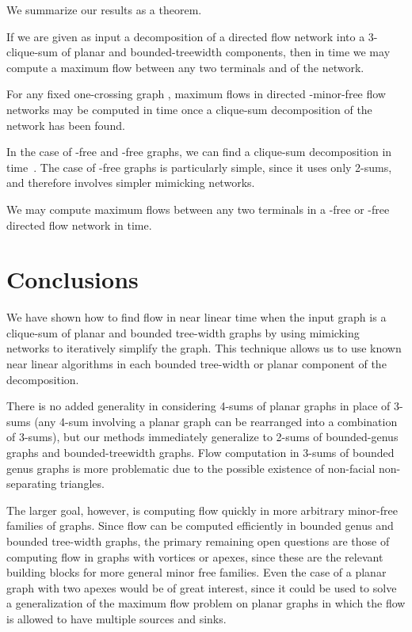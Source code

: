\documentclass[runningheads]{llncs}
\begin{document}
We summarize our results as a theorem.

\begin{theorem}
If we are given as input a decomposition of a directed flow network into a 3-clique-sum of planar and bounded-treewidth components, then in  time we may compute a maximum flow between any two terminals  and  of the network.
\end{theorem}

\begin{corollary}
For any fixed one-crossing graph , maximum flows in directed -minor-free flow networks may be computed in  time once a clique-sum decomposition of the network has been found.
\end{corollary}

In the case of -free and -free graphs, we can find a clique-sum decomposition in  time~\cite{asano85,rl-ork5mfg-08}. The case of -free graphs is particularly simple, since it uses only 2-sums, and therefore involves simpler mimicking networks.

\begin{corollary}
We may compute maximum flows between any two terminals in a -free or -free directed flow network in  time.
\end{corollary}



\section{Conclusions}

We have shown how to find flow in near linear time when the input graph is a clique-sum of planar and bounded tree-width graphs by using mimicking networks to iteratively simplify the graph. This technique allows us to use known near linear algorithms in each bounded tree-width or planar component of the decomposition.

There is no added generality in considering 4-sums of planar graphs in place of 3-sums (any 4-sum involving a planar graph can be rearranged into a combination of 3-sums), but our methods immediately generalize to 2-sums of bounded-genus graphs and bounded-treewidth graphs. Flow computation in 3-sums of bounded genus graphs is more problematic due to the possible existence of non-facial non-separating triangles.

The larger goal, however, is computing flow quickly in more arbitrary minor-free families of graphs.  Since flow can be computed efficiently in bounded genus and bounded tree-width graphs, the primary remaining open questions are those of computing flow in graphs with vortices or apexes, since these are the relevant building blocks for more general minor free families.   Even the case of a planar graph with two apexes would be of great interest, since it could be used to solve a generalization of the maximum flow problem on planar graphs in which the flow is allowed to have multiple sources and sinks.
\end{document}

